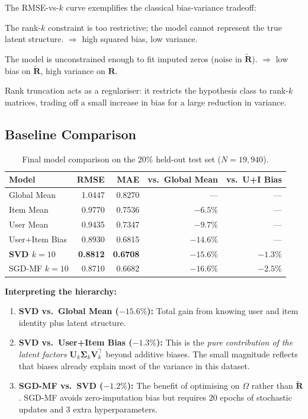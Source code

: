 \documentclass[12pt, a4paper]{article}
\newcommand{\Rmat}{\mathbf{R}}
\newcommand{\Umat}{\mathbf{U}}
\newcommand{\Smat}{\boldsymbol{\Sigma}}
\newcommand{\Vmat}{\mathbf{V}}
\newcommand{\Om}{\Omega}
\begin{document}
The RMSE-vs-$k$ curve exemplifies the classical bias-variance tradeoff:

\begin{description}[leftmargin=2.5cm, font=\textbf]
  \item[Bias (low $k$)] The rank-$k$ constraint is too restrictive;
    the model cannot represent the true latent structure.
    $\Rightarrow$ high squared bias, low variance.
  \item[Variance (high $k$)] The model is unconstrained enough to
    fit imputed zeros (noise in $\tilde{\Rmat}$).
    $\Rightarrow$ low bias on $\tilde{\Rmat}$, high variance on $\Rmat$.
  \item[Optimum ($k=10$)] Rank truncation acts as a regulariser:
    it restricts the hypothesis class to rank-$k$ matrices,
    trading off a small increase in bias for a large reduction in variance.
\end{description}

\subsection{Baseline Comparison}

\begin{table}[h!]
\centering
\caption{Final model comparison on the 20\% held-out test set ($N=19{,}940$).}
\begin{tabular}{lrrrr}
\toprule
\textbf{Model} & \textbf{RMSE} & \textbf{MAE} & \textbf{vs.\ Global Mean} & \textbf{vs.\ U+I Bias} \\
\midrule
Global Mean       & 1.0447 & 0.8270 & ---      & --- \\
Item Mean         & 0.9770 & 0.7536 & $-6.5\%$ & --- \\
User Mean         & 0.9435 & 0.7347 & $-9.7\%$ & --- \\
User+Item Bias    & 0.8930 & 0.6815 & $-14.6\%$& --- \\
\textbf{SVD $k=10$} & \textbf{0.8812} & \textbf{0.6708} & $\mathbf{-15.6\%}$ & $\mathbf{-1.3\%}$ \\
SGD-MF $k=10$     & 0.8710 & 0.6682 & $-16.6\%$& $-2.5\%$ \\
\bottomrule
\end{tabular}
\label{tab:compare}
\end{table}

\noindent\textbf{Interpreting the hierarchy:}
\begin{enumerate}
  \item \textbf{SVD vs.\ Global Mean ($-15.6\%$):} Total gain from
        knowing user and item identity plus latent structure.
  \item \textbf{SVD vs.\ User+Item Bias ($-1.3\%$):}
        This is the \emph{pure contribution of the latent factors
        $\Umat_k\Smat_k\Vmat_k^\top$} beyond additive biases.
        The small magnitude reflects that biases already explain
        most of the variance in this dataset.
  \item \textbf{SGD-MF vs.\ SVD ($-1.2\%$):}
        The benefit of optimising on $\Om$ rather than $\tilde{\Rmat}$.
        SGD-MF avoids zero-imputation bias but requires 20 epochs of
        stochastic updates and 3 extra hyperparameters.
\end{enumerate}
\end{document}
